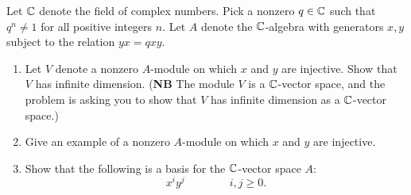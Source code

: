 \begin{question}[subtitle = January 2024 Problem 5,ID=Jan24_5]
Let $\mathbb{C}$ denote the field of complex numbers. Pick a nonzero $q \in \mathbb{C}$ such that $q^n \neq 1$ for all positive integers $n$. Let $A$ denote the $\mathbb{C}$-algebra with generators $x,y$ subject to the relation $yx = qxy$.
\begin{enumerate}
    \item Let $V$ denote a nonzero $A$-module on which $x$ and $y$ are injective. Show that $V$ has infinite dimension. (\textbf{NB} The module $V$ is a $\mathbb{C}$-vector space, and the problem is asking you to show that $V$ has infinite dimension as a $\mathbb{C}$-vector space.)
    \item Give an example of a nonzero $A$-module on which $x$ and $y$ are injective.
    \item Show that the following is a basis for the $\mathbb{C}$-vector space $A$:
    \[x^iy^j \qquad \qquad i,j \geq 0.\]
\end{enumerate}
\end{question}
